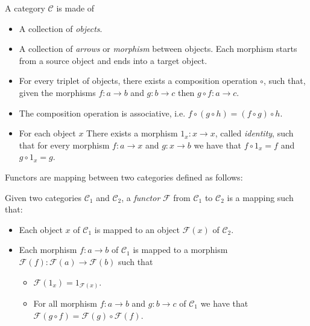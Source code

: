 \begin{definition}
	A category $\mathcal{C}$ is made of
	
	\begin{itemize}[noitemsep]
		\item A collection of \textit{objects}.
		\item A collection of \textit{arrows} or \textit{morphism} between objects. Each morphism starts from a source object and ends into a target object.
		\item For every triplet of objects, there exists a composition operation $\circ$, such that, given the morphisms $f:a \rightarrow b$ and $g:b \rightarrow c$ then $g \circ f: a \rightarrow c$.
		\item The composition operation is associative, i.e. $f \circ (g \circ h) = (f \circ g) \circ h$.
		\item For each object $x$ There exists a morphism $1_x: x \rightarrow x$, called \textit{identity}, such that for every morphism $f:a \rightarrow x$ and $g: x \rightarrow b$ we have that $f \circ 1_x = f$ and $g \circ 1_x = g$.
	\end{itemize}
\end{definition}

\noindent
Functors are mapping between two categories defined as follows:

\begin{definition}
	Given two categories $\mathcal{C}_1$ and $\mathcal{C}_2$, a \textit{functor} $\mathcal{F}$ from $\mathcal{C}_1$ to $\mathcal{C}_2$ is a mapping such that:
	
	\begin{itemize}
		\item Each object $x$ of $\mathcal{C}_1$ is mapped to an object $\mathcal{F}(x)$ of $\mathcal{C}_2$.
		\item Each morphism $f: a \rightarrow b$ of $\mathcal{C}_1$ is mapped to a morphism $\mathcal{F}(f): \mathcal{F}(a) \rightarrow \mathcal{F}(b)$ such that
		\begin{itemize}
			\item $\mathcal{F}(1_x) = 1_{\mathcal{F}(x)}$.
			\item For all morphism $f: a \rightarrow b$ and $g: b \rightarrow c$ of $\mathcal{C}_1$ we have that $\mathcal{F}(g \circ f) = \mathcal{F}(g) \circ \mathcal{F}(f)$.
		\end{itemize}
	\end{itemize}
\end{definition}

